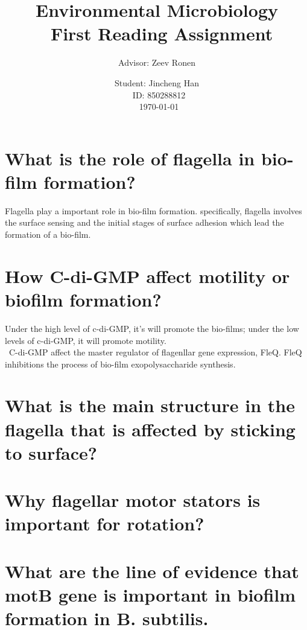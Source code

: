 \documentclass[12pt]{article}%
\begin{document}
\title{Environmental Microbiology \\\
First Reading Assignment}
\author{Advisor: Zeev Ronen}
\date{Student: Jincheng Han\\\
ID: 850288812\\\
\today}
\maketitle
\section{What is the role of flagella in bio-film formation?
}
Flagella play a important role in bio-film formation. specifically, flagella involves the surface sensing and the initial stages of surface adhesion which lead the formation of a bio-film. 




\section{How C-di-GMP  affect motility or biofilm formation?
}
Under the high level of c-di-GMP, it's will promote the bio-films; under the low levels of c-di-GMP, it will promote motility. \\\
C-di-GMP affect the master regulator of flagenllar gene expression, FleQ. FleQ inhibitions the process of bio-film exopolysaccharide synthesis.

\section{What is the main structure in the flagella that is affected by sticking to surface?
}




\section{Why flagellar motor stators is important for rotation?
}     



\section{What are the line of evidence that motB gene is important in biofilm formation in  B. subtilis.  
}
\end{document}
